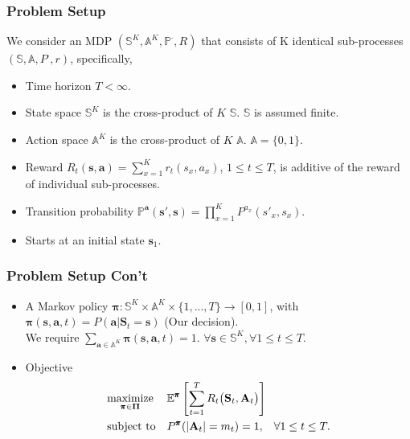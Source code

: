 \documentclass{beamer}
\newcommand{\av}{\mathbf{a}}
\newcommand{\allp}{\pmb{\pi}}
\newcommand{\allpset}{\mathbf{\Pi}}
\newcommand{\allstates}{\mathbb{S}^K}
\newcommand{\allstate}{\mathbf{s}}
\newcommand{\allstater}{\mathbf{S}}
\newcommand{\allactions}{\mathbb{A}^K}
\newcommand{\allaction}{\av}
\newcommand{\allar}{\mathbf{A}}
\newcommand{\allpr}{\mathbb{P}}
\newcommand{\allr}{R}
\newcommand{\subr}{r}
\newcommand{\substates}{\mathbb{S}}
\newcommand{\substate}{s}
\newcommand{\subactions}{\mathbb{A}}
\newcommand{\subpr}{P}
\newcommand{\subaction}{a}
\begin{document}
\begin{frame}
\frametitle{Problem Setup}
We consider an MDP $(\allstates,\allactions,\allpr^{\cdot},\allr)$ that consists of K identical sub-processes $(\substates,\subactions,\subpr^{\cdot},\subr)$, specifically,
\begin{itemize}
\item Time horizon $T<\infty$.
\item State space $\allstates$ is the cross-product of $K$ $\substates$. $\substates$ is assumed finite.
\item Action space $\allactions$ is the cross-product of $K$ $\subactions$. $\subactions=\{0,1\}$.
\item Reward $\allr_t(\allstate,\allaction) = \sum_{x=1}^K \subr_t(\substate_x,\subaction_x)$, $1\leq t\leq T$, is additive of the reward of individual sub-processes.
\item Transition probability $\allpr^{\allaction}(\allstate',\allstate) = \prod_{x=1}^{K}\subpr^{\subaction_x}(\substate'_x,\substate_x)$.
\item Starts at an initial state $\allstate_1$.
\end{itemize}
\end{frame}

\begin{frame}
\frametitle{Problem Setup Con't}
\begin{itemize}
\item A Markov policy $\allp:\allstates\times \allactions \times \{1,...,T\} \rightarrow [0,1]$, with $\allp(\allstate,\allaction,t) = P(\allaction|\allstater_t=\allstate)$ (Our decision).\\ We require $\sum_{\allaction\in\allactions}\allp(\allstate,\allaction,t)=1$.
$\forall \allstate\in\allstates, \forall 1\leq t\leq T$.
\item Objective
\begin{equation}\label{prime}
\begin{aligned}
& \underset{\allp\in\allpset}{\text{maximize}}
& & \mathbb{E}^{\allp}\left[\sum_{t=1}^{T}\allr_t\big(\allstater_t,\allar_t\big)\right] \\
& \text{subject to}
& & P^{\allp}(|\allar_t|=m_t)=1, \hspace{3mm}\forall 1\leq t\leq T .
\end{aligned}
\end{equation}
\end{itemize}
\end{frame}
\end{document}
